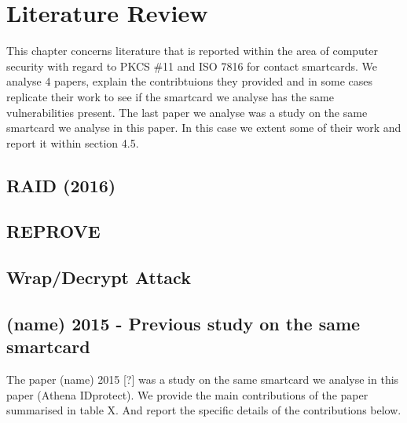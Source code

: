 \documentclass[bsc,frontabs,twoside,singlespacing,parskip,deptreport]{infthesis}     %
\begin{document}

\chapter{Literature Review}

This chapter concerns literature that is reported within the area of computer security with regard to PKCS \#11 and ISO 7816 for contact smartcards. We analyse 4 papers, explain the contribtuions they provided and in some cases replicate their work to see if the smartcard we analyse has the same vulnerabilities present. The last paper we analyse was a study on the same smartcard we analyse in this paper. In this case we extent some of their work and report it within section 4.5.

\section{RAID (2016)}

\section{REPROVE}

\section{Wrap/Decrypt Attack}

\section{(name) 2015 - Previous study on the same smartcard}

The paper (name) 2015 [?] was a study on the same smartcard we analyse in this paper (Athena IDprotect). We provide the main contributions of the paper summarised in table X. And report the specific details of the contributions below.
\end{document}
